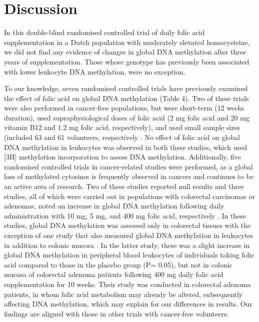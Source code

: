  
\section{Discussion} %
\noindent In this double-blind randomised controlled trial of daily folic acid supplementation in a Dutch population with moderately elevated homocysteine, we did not find any evidence of changes in global DNA methylation after three years of supplementation. Those whose genotype has previously been associated with lower leukocyte DNA methylation, were no exception. 
 
\noindent To our knowledge, seven randomised controlled trials have previously examined the effect of folic acid on global DNA methylation (Table 4). Two of these trials were also performed in cancer-free populations, but were short-term (12 weeks duration), used supraphysiological doses of folic acid (2 mg folic acid and 20 mg vitamin B12 and 1.2 mg folic acid, respectively), and used small sample sizes (included 63 and 61 volunteers, respectively \cite{c434,c435}. No effect of folic acid on global DNA methylation in leukocytes was observed in both these studies, which used [3H] methylation incorporation to assess DNA methylation. Additionally, five randomised controlled trials in cancer-related studies were performed, as a global loss of methylated cytosines is frequently observed in cancers \cite{c436} and continues to be an active area of research. Two of these studies reported null results \cite{c437,c438} and three studies, all of which were carried out in populations with colorectal carcinomas or 
adenomas, noted an increase in global DNA methylation following daily administration with 10 mg, 5 mg, and 400 mg folic acid, respectively \cite{c439,c441}. In these studies, global DNA methylation was assessed only in colorectal tissues with the exception of one study that also measured global DNA methylation in leukocytes in addition to colonic mucosa \cite{c441}. In the latter study, there was a slight increase in global DNA methylation in peripheral blood leukocytes of individuals taking folic acid compared to those in the placebo group (P= 0.05), but not in colonic mucosa of colorectal adenoma patients following 400 mg daily folic acid supplementation for 10 weeks. Their study was conducted in colorectal adenoma patients, in whom folic acid metabolism may already be altered, subsequently affecting DNA methylation, which may explain for our differences in results. Our findings are aligned with those in other trials with cancer-free volunteers.

